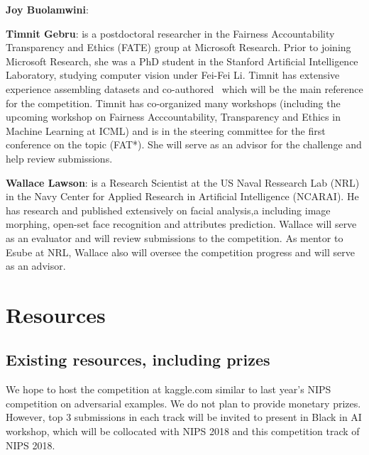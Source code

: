 \documentclass[11pt, oneside]{article}
\makeatletter
\let\@internalcite\cite
\def\cite{\def\citeauthoryear##1##2{##1, ##2}\@internalcite}
\makeatother
\begin{document}
{\bf Joy Buolamwini}:

{\bf Timnit Gebru}: is a postdoctoral researcher in the Fairness Accountability Transparency and Ethics (FATE) group at Microsoft Research. Prior to joining Microsoft Research, she was a PhD student in the Stanford Artificial Intelligence Laboratory, studying computer vision under Fei-Fei Li. Timnit has extensive experience assembling datasets and co-authored~\cite{buolamwini2018gender} which will be the main reference for the competition. Timnit has co-organized many workshops (including the upcoming workshop on Fairness Acccountability, Transparency and Ethics in Machine Learning at ICML) and is in the steering committee for the first conference on the topic (FAT*). She will serve as an advisor for the challenge and help review submissions.

{\bf Wallace Lawson}: is a Research Scientist at the US Naval Ressearch Lab
(NRL) in the Navy Center for Applied Research in Artificial Intelligence
(NCARAI).  He has research and published extensively on facial analysis,a
including image morphing, open-set face recognition and attributes prediction.
Wallace will serve as an evaluator and will review submissions to the
competition. As mentor to Esube at NRL, Wallace also will oversee the
competition progress and will serve as an advisor.



\section{Resources}
\subsection{Existing resources, including prizes}

We hope to host the competition at kaggle.com similar to last year's NIPS
competition on adversarial examples. We do not plan to provide monetary prizes.
However, top 3 submissions in each track will be invited to present in Black in
AI workshop, which will be collocated with NIPS 2018 and this competition track
of NIPS 2018.



%

\end{document}
